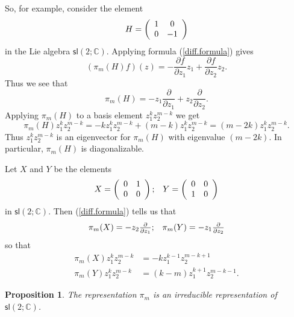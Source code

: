 \documentclass{amsbook}
\theoremstyle{plain}
\newtheorem{proposition}[theorem]{Proposition}
\numberwithin{equation}{chapter}
\numberwithin{theorem}{chapter}
\begin{document}
So, for example, consider the element
\[
H=\left(
\begin{array}
[c]{cc}%
1 & 0\\
0 & -1
\end{array}
\right)
\]
in the Lie algebra $\mathsf{sl}(2;\mathbb{C})$. Applying formula
(\ref{diff.formula}) gives
\[
\left(  \pi_{m}(H)f\right)  (z)=-\frac{\partial f}{\partial z_{1}}z_{1}%
+\frac{\partial f}{\partial z_{2}}z_{2}\text{.}%
\]
Thus we see that
\begin{equation}
\pi_{m}(H)=-z_{1}\frac\partial{\partial z_{1}}+z_{2}\frac\partial{\partial
z_{2}}\text{.}\label{pi.h}%
\end{equation}
Applying $\pi_{m}(H)$ to a basis element $z_{1}^{k}z_{2}^{m-k}$ we get
\[
\pi_{m}(H)z_{1}^{k}z_{2}^{m-k}=-kz_{1}^{k}z_{2}^{m-k}+(m-k)z_{1}^{k}%
z_{2}^{m-k}=(m-2k)z_{1}^{k}z_{2}^{m-k}\text{.}%
\]
Thus $z_{1}^{k}z_{2}^{m-k}$ is an eigenvector for $\pi_{m}(H)$ with eigenvalue
$(m-2k)$. In particular, $\pi_{m}(H)$ is diagonalizable.

Let $X$ and $Y$ be the elements
\[%
\begin{array}
[c]{cc}%
X=\left(
\begin{array}
[c]{cc}%
0 & 1\\
0 & 0
\end{array}
\right)  ; & Y=\left(
\begin{array}
[c]{cc}%
0 & 0\\
1 & 0
\end{array}
\right)
\end{array}
\]
in $\mathsf{sl}(2;\mathbb{C})$. Then (\ref{diff.formula}) tells us that
\[%
\begin{array}
[c]{cc}%
\pi_{m}(X)=-z_{2}\frac{\partial}{\partial z_{1}}; & \pi_{m}(Y)=-z_{1}%
\frac{\partial}{\partial z_{2}}%
\end{array}
\]
so that
\begin{align}
\pi_{m}(X)z_{1}^{k}z_{2}^{m-k}  & =-kz_{1}^{k-1}z_{2}^{m-k+1}\nonumber\\
\pi_{m}(Y)z_{1}^{k}z_{2}^{m-k}  & =(k-m)z_{1}^{k+1}z_{2}^{m-k-1}%
\text{.}\label{poly.act}%
\end{align}

\begin{proposition}
\label{poly.irred}The representation $\pi_{m}$ is an irreducible
representation of $\mathsf{sl}(2;\mathbb{C})$.
\end{proposition}
\end{document}
